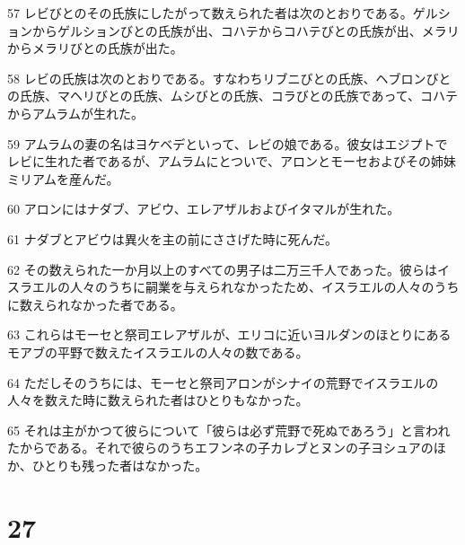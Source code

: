 \par 57 レビびとのその氏族にしたがって数えられた者は次のとおりである。ゲルションからゲルションびとの氏族が出、コハテからコハテびとの氏族が出、メラリからメラリびとの氏族が出た。
\par 58 レビの氏族は次のとおりである。すなわちリブニびとの氏族、ヘブロンびとの氏族、マヘリびとの氏族、ムシびとの氏族、コラびとの氏族であって、コハテからアムラムが生れた。
\par 59 アムラムの妻の名はヨケベデといって、レビの娘である。彼女はエジプトでレビに生れた者であるが、アムラムにとついで、アロンとモーセおよびその姉妹ミリアムを産んだ。
\par 60 アロンにはナダブ、アビウ、エレアザルおよびイタマルが生れた。
\par 61 ナダブとアビウは異火を主の前にささげた時に死んだ。
\par 62 その数えられた一か月以上のすべての男子は二万三千人であった。彼らはイスラエルの人々のうちに嗣業を与えられなかったため、イスラエルの人々のうちに数えられなかった者である。
\par 63 これらはモーセと祭司エレアザルが、エリコに近いヨルダンのほとりにあるモアブの平野で数えたイスラエルの人々の数である。
\par 64 ただしそのうちには、モーセと祭司アロンがシナイの荒野でイスラエルの人々を数えた時に数えられた者はひとりもなかった。
\par 65 それは主がかつて彼らについて「彼らは必ず荒野で死ぬであろう」と言われたからである。それで彼らのうちエフンネの子カレブとヌンの子ヨシュアのほか、ひとりも残った者はなかった。

\chapter{27}

